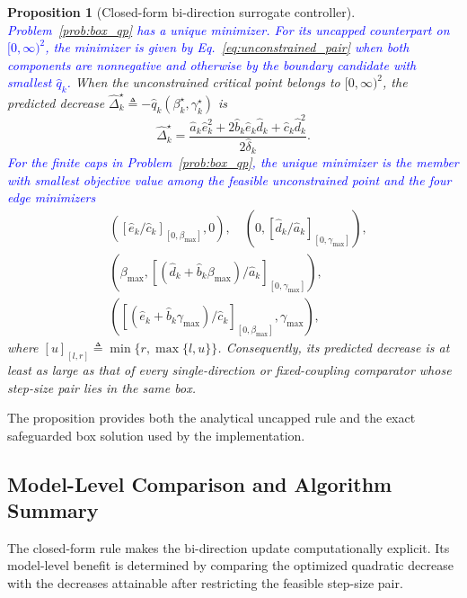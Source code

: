 \documentclass[journal]{IEEEtran}
\newtheorem{proposition}{Proposition}
\theoremstyle{remark}
\begin{document}
	\begin{proposition}[Closed-form bi-direction surrogate controller]\label{prop:closed_form}
		\textcolor{blue}{Problem~\eqref{prob:box_qp} has a unique minimizer.}
		\textcolor{blue}{For its uncapped counterpart on $[0,\infty)^2$, the minimizer is given by Eq.~\eqref{eq:unconstrained_pair} when both components are nonnegative and otherwise by the boundary candidate with smallest $\hat q_k$.}
		When the unconstrained critical point belongs to $[0,\infty)^2$, the predicted decrease $\widehat\Delta_{k}^{\star}\triangleq -\hat q_{k}(\beta_{k}^{\star},\gamma_{k}^{\star})$ is
		\begin{equation}\label{eq:Delta_hat_interior}
			\widehat\Delta_{k}^{\star}=\frac{\hat a_{k}\hat e_{k}^{2}+2\hat b_{k}\hat e_{k}\hat d_{k}+\hat c_{k}\hat d_{k}^{2}}{2\hat\delta_{k}}.
		\end{equation}
		\textcolor{blue}{For the finite caps in Problem~\eqref{prob:box_qp}, the unique minimizer is the member with smallest objective value among the feasible unconstrained point and the four edge minimizers}
		\begin{align*}
			&\left(\left[\hat e_k/\hat c_k\right]_{[0,\beta_{\max}]},0\right),\quad
			\left(0,\left[\hat d_k/\hat a_k\right]_{[0,\gamma_{\max}]}\right),\\
			&\left(\beta_{\max},
			\left[(\hat d_k+\hat b_k\beta_{\max})/\hat a_k\right]_{[0,\gamma_{\max}]}\right),\\
			&\left(\left[(\hat e_k+\hat b_k\gamma_{\max})/\hat c_k\right]_{[0,\beta_{\max}]},
			\gamma_{\max}\right),
		\end{align*}
		where $[u]_{[l,r]}\triangleq\min\{r,\max\{l,u\}\}$.
		Consequently, its predicted decrease is at least as large as that of every single-direction or fixed-coupling comparator whose step-size pair lies in the same box.
	\end{proposition}
	
	The proposition provides both the analytical uncapped rule and the exact safeguarded box solution used by the implementation.
	
	\subsection{Model-Level Comparison and Algorithm Summary}\label{subsec:dominance}
	
	The closed-form rule makes the bi-direction update computationally explicit.
	Its model-level benefit is determined by comparing the optimized quadratic decrease with the decreases attainable after restricting the feasible step-size pair.
	
\end{document}
